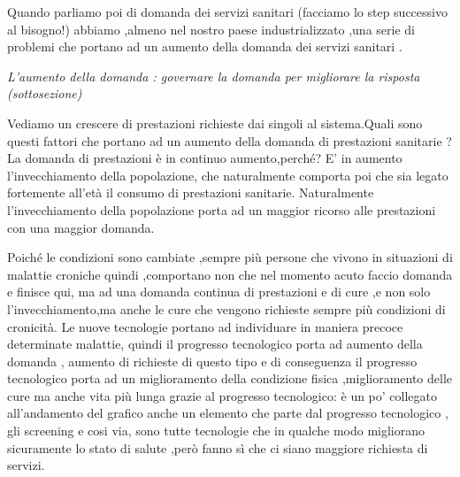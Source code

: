 \documentclass[]{article}
\begin{document}
Quando parliamo poi di domanda dei servizi sanitari (facciamo lo step
successivo al bisogno!) abbiamo ,almeno nel nostro paese
industrializzato ,una serie di problemi che portano ad un aumento della
domanda dei servizi sanitari .

\emph{L'aumento della domanda : governare la domanda per migliorare la
risposta (sottosezione)}

Vediamo un crescere di prestazioni richieste dai singoli al
sistema.Quali sono questi fattori che portano ad un aumento della
domanda di prestazioni sanitarie ? La domanda di prestazioni è in
continuo aumento,perché? E' in aumento l'invecchiamento della
popolazione, che naturalmente comporta poi che sia legato fortemente
all'età il consumo di prestazioni sanitarie. Naturalmente
l'invecchiamento della popolazione porta ad un maggior ricorso alle
prestazioni con una maggior domanda.

Poiché le condizioni sono cambiate ,sempre più persone che vivono in
situazioni di malattie croniche quindi ,comportano non che nel momento
acuto faccio domanda e finisce qui, ma ad una domanda continua di
prestazioni e di cure ,e non solo l'invecchiamento,ma anche le cure che
vengono richieste sempre più condizioni di cronicità. Le nuove
tecnologie portano ad individuare in maniera precoce determinate
malattie, quindi il progresso tecnologico porta ad aumento della domanda
, aumento di richieste di questo tipo e di conseguenza il progresso
tecnologico porta ad un miglioramento della condizione fisica
,miglioramento delle cure ma anche vita più lunga grazie al progresso
tecnologico: è un po' collegato all'andamento del grafico anche un
elemento che parte dal progresso tecnologico , gli screening e cosi via,
sono tutte tecnologie che in qualche modo migliorano sicuramente lo
stato di salute ,però fanno sì che ci siano maggiore richiesta di
servizi.
\end{document}
